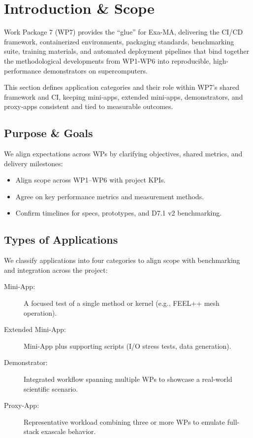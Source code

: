 
\section{Introduction \& Scope}
\label{sec:apps-intro}

Work Package 7 (WP7) provides the “glue” for Exa-MA, delivering the CI/CD framework, containerized environments, packaging standards, benchmarking suite, training materials, and automated deployment pipelines that bind together the methodological developments from WP1-WP6 into reproducible, high-performance demonstrators on supercomputers.

This section defines application categories and their role within WP7’s shared framework and CI, keeping mini‑apps, extended mini‑apps, demonstrators, and proxy‑apps consistent and tied to measurable outcomes.

\subsection{Purpose \& Goals}
We align expectations across WPs by clarifying objectives, shared metrics, and delivery milestones:
\begin{itemize}
  \item Align scope across WP1–WP6 with project KPIs.
  \item Agree on key performance metrics and measurement methods.
  \item Confirm timelines for specs, prototypes, and D7.1 v2 benchmarking.
\end{itemize}

\subsection{Types of Applications}
We classify applications into four categories to align scope with benchmarking and integration across the project:
\begin{description}
  \item[Mini-App:] A focused test of a single method or kernel (e.g., FEEL++ mesh operation).
  \item[Extended Mini-App:] Mini-App plus supporting scripts (I/O stress tests, data generation).
  \item[Demonstrator:] Integrated workflow spanning multiple WPs to showcase a real-world scientific scenario.
  \item[Proxy-App:] Representative workload combining three or more WPs to emulate full-stack exascale behavior.
\end{description}
